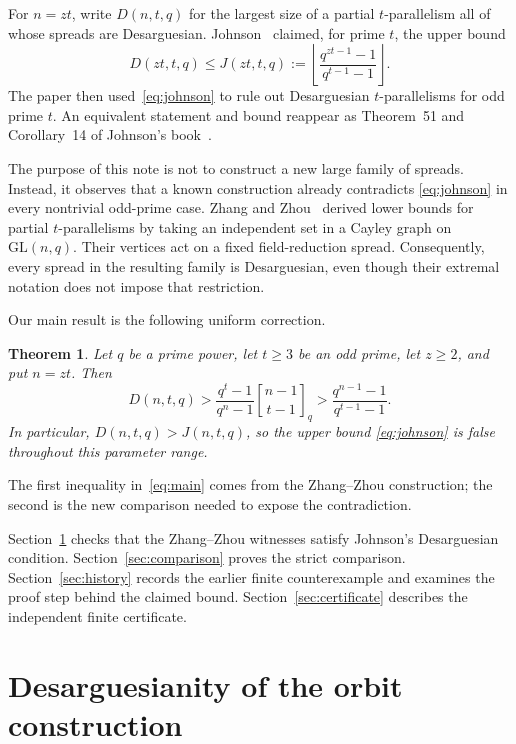 \documentclass[11pt]{article}
\newtheorem{theorem}{Theorem}[section]
\newcommand{\qbinom}[2]{\genfrac{[}{]}{0pt}{}{#1}{#2}_{q}}
\begin{document}
For $n=zt$, write $D(n,t,q)$ for the largest size of a partial
$t$-parallelism all of whose spreads are Desarguesian. Johnson~\cite[Corollary~1]{JohnsonPaper}
claimed, for prime $t$, the upper bound
\begin{equation}
D(zt,t,q)\leq
J(zt,t,q):=
\left\lfloor
\frac{q^{zt-1}-1}{q^{t-1}-1}
\right\rfloor.
\label{eq:johnson}
\end{equation}
The paper then used~\eqref{eq:johnson} to rule out Desarguesian
$t$-parallelisms for odd prime $t$. An equivalent statement and bound
reappear as Theorem~51 and Corollary~14 of Johnson's
book~\cite[Chapter~10]{JohnsonBook}.

The purpose of this note is not to construct a new large family of spreads.
Instead, it observes that a known construction already contradicts
\eqref{eq:johnson} in every nontrivial odd-prime case. Zhang and
Zhou~\cite{ZhangZhou} derived lower bounds for partial $t$-parallelisms by
taking an independent set in a Cayley graph on $\mathrm{GL}(n,q)$. Their
vertices act on a fixed field-reduction spread. Consequently, every spread in
the resulting family is Desarguesian, even though their extremal notation does
not impose that restriction.

Our main result is the following uniform correction.

\begin{theorem}\label{thm:main}
Let $q$ be a prime power, let $t\geq3$ be an odd prime, let $z\geq2$, and put
$n=zt$. Then
\begin{equation}
D(n,t,q)>
\frac{q^t-1}{q^n-1}\qbinom{n-1}{t-1}
>
\frac{q^{n-1}-1}{q^{t-1}-1}.
\label{eq:main}
\end{equation}
In particular, $D(n,t,q)>J(n,t,q)$, so the upper bound
\eqref{eq:johnson} is false throughout this parameter range.
\end{theorem}

The first inequality in~\eqref{eq:main} comes from the Zhang--Zhou
construction; the second is the new comparison needed to expose the
contradiction.

Section~\ref{sec:orbit} checks that the Zhang--Zhou witnesses satisfy
Johnson's Desarguesian condition. Section~\ref{sec:comparison} proves the
strict comparison. Section~\ref{sec:history} records the earlier finite
counterexample and examines the proof step behind the claimed bound.
Section~\ref{sec:certificate} describes the independent finite certificate.

\section{Desarguesianity of the orbit construction}\label{sec:orbit}
\end{document}
